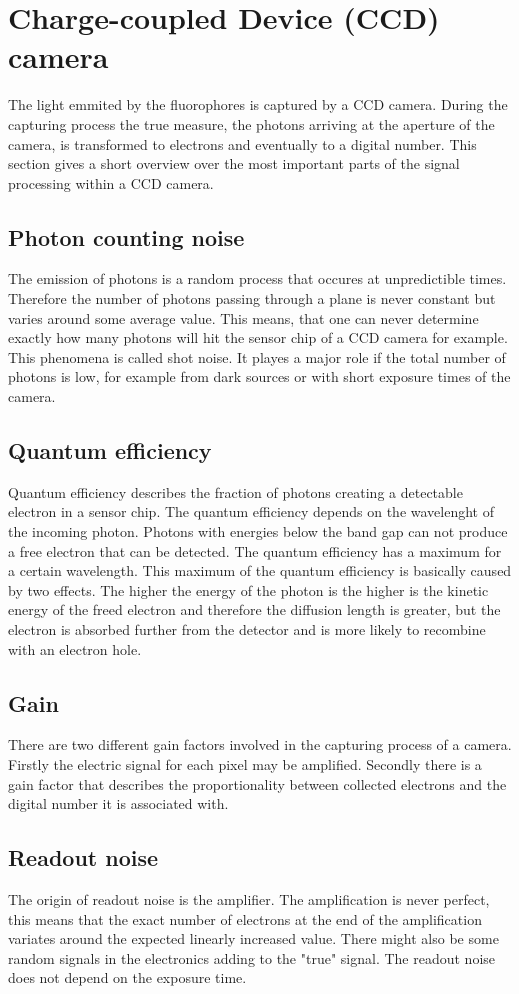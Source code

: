 \section{Charge-coupled Device (CCD) camera}
The light emmited by the fluorophores is captured by a CCD camera. During the capturing process the true measure, the photons arriving at the aperture of the camera, is transformed to electrons and eventually to a digital number. This section gives a short overview over the most important parts of the signal processing within a CCD camera.
\subsection{Photon counting noise}
The emission of photons is a random process that occures at unpredictible times. Therefore the number of photons passing through a plane is never constant but varies around some average value. This means, that one can never determine exactly how many photons will hit the sensor chip of a CCD camera for example. This phenomena is called shot noise. It playes a major role if the total number of photons is low, for example from dark sources or with short exposure times of the camera.
\subsection{Quantum efficiency}
Quantum efficiency describes the fraction of photons creating a detectable electron in a sensor chip. The quantum efficiency depends on the wavelenght of the incoming photon. Photons with energies below the band gap can not produce a free electron that can be detected. The quantum efficiency has a maximum for a certain wavelength. This maximum of the quantum efficiency is basically caused by two effects. The higher the energy of the photon is the higher is the kinetic energy of the freed electron and therefore the diffusion length is greater, but the electron is absorbed further from the detector and is more likely to recombine with an electron hole.
\subsection{Gain}
There are two different gain factors involved in the capturing process of a camera. Firstly the electric signal for each pixel may be amplified. Secondly there is a gain factor that describes the proportionality between collected electrons and the digital number it is associated with.
\subsection{Readout noise}
The origin of readout noise is the amplifier. The amplification is never perfect, this means that the exact number of electrons at the end of the amplification variates around the expected linearly increased value. There might also be some random signals in the electronics adding to the "true" signal. The readout noise does not depend on the exposure time.
